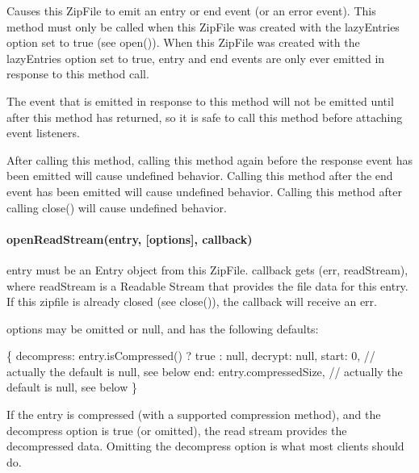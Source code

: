 Causes this {\ttfamily Zip\+File} to emit an {\ttfamily entry} or {\ttfamily end} event (or an {\ttfamily error} event). This method must only be called when this {\ttfamily Zip\+File} was created with the {\ttfamily lazy\+Entries} option set to {\ttfamily true} (see {\ttfamily open()}). When this {\ttfamily Zip\+File} was created with the {\ttfamily lazy\+Entries} option set to {\ttfamily true}, {\ttfamily entry} and {\ttfamily end} events are only ever emitted in response to this method call.

The event that is emitted in response to this method will not be emitted until after this method has returned, so it is safe to call this method before attaching event listeners.

After calling this method, calling this method again before the response event has been emitted will cause undefined behavior. Calling this method after the {\ttfamily end} event has been emitted will cause undefined behavior. Calling this method after calling {\ttfamily close()} will cause undefined behavior.

\paragraph*{open\+Read\+Stream(entry, \mbox{[}options\mbox{]}, callback)}

{\ttfamily entry} must be an {\ttfamily Entry} object from this {\ttfamily Zip\+File}. {\ttfamily callback} gets {\ttfamily (err, read\+Stream)}, where {\ttfamily read\+Stream} is a {\ttfamily Readable Stream} that provides the file data for this entry. If this zipfile is already closed (see {\ttfamily close()}), the {\ttfamily callback} will receive an {\ttfamily err}.

{\ttfamily options} may be omitted or {\ttfamily null}, and has the following defaults\+:


\begin{DoxyCode}
\{
  decompress: entry.isCompressed() ? true : null,
  decrypt: null,
  start: 0,                  // actually the default is null, see below
  end: entry.compressedSize, // actually the default is null, see below
\}
\end{DoxyCode}


If the entry is compressed (with a supported compression method), and the {\ttfamily decompress} option is {\ttfamily true} (or omitted), the read stream provides the decompressed data. Omitting the {\ttfamily decompress} option is what most clients should do.

